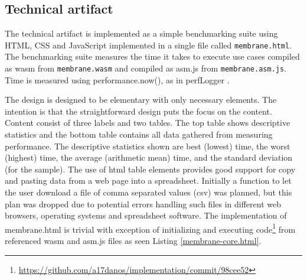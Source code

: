
\subsection{Technical artifact}


The technical artifact is implemented as a simple benchmarking suite using HTML, CSS and JavaScript implemented in a single file called \texttt{membrane.html}. The benchmarking suite measures the time it takes to execute use cases compiled as wasm from \texttt{membrane.wasm} and compiled as asm.js from \texttt{membrane.asm.js}. Time is measured using performance.now(), as in perfLogger \parencite{Barker2012}. 


The design is designed to be elementary with only necessary elements. The intention is that the straightforward design puts the focus on the content. Content consist of three labels and two tables. The top table shows descriptive statistics and the bottom table contains all data gathered from measuring performance. The descriptive statistics shown are best (lowest) time, the worst (highest) time, the average (arithmetic mean) time, and the standard deviation (for the sample). The use of html table elements provides good support for copy and pasting data from a web page into a spreadsheet. Initially a function to let the user download a file of comma separated values (csv) was planned, but this plan was dropped due to potential errors handling such files in different web browsers, operating systems and spreadsheet software. The implementation of membrane.html is trivial with exception of initializing and executing code\footnote{\url{https://github.com/a17danos/implementation/commit/98cee52}} from referenced wasm and asm.js files as seen Listing \ref{membrane-core.html}.




